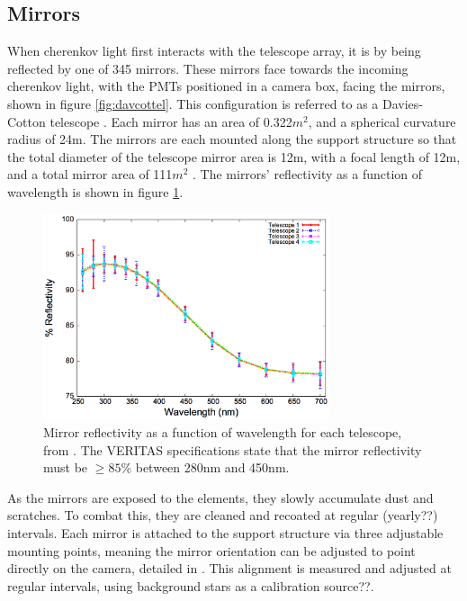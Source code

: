 \subsection{Mirrors}

When cherenkov light first interacts with the telescope array, it is by being reflected by one of 345 mirrors.
These mirrors face towards the incoming cherenkov light, with the PMTs positioned in a camera box, facing the mirrors, shown in figure \ref{fig:davcottel}.
This configuration is referred to as a Davies-Cotton telescope \cite{daviescotton}.
Each mirror has an area of 0.322$m^2$, and a spherical curvature radius of 24m.
The mirrors are each mounted along the support structure so that the total diameter of the telescope mirror area is 12m, with a focal length of 12m, and a total mirror area of 111$m^2$ \cite{Veritas_Detector}.
The mirrors' reflectivity as a function of wavelength is shown in figure \ref{fig:mirreflect}.

\begin{figure}[h]
  \begin{center}
    \includegraphics[width=0.75\textwidth]{images/mirror_reflect}
    \caption[Mirror Reflectivity]{Mirror reflectivity as a function of wavelength for each telescope, from \cite{mirrorfacets}.  The VERITAS specifications state that the mirror reflectivity must be $\geq 85\%$ between 280nm and 450nm.}\label{fig:mirreflect}
  \end{center}
\end{figure}

As the mirrors are exposed to the elements, they slowly accumulate dust and scratches.
To combat this, they are cleaned and recoated at regular (yearly??) intervals.
Each mirror is attached to the support structure via three adjustable mounting points, meaning the mirror orientation can be adjusted to point directly on the camera, detailed in \cite{mirroralign}.
This alignment is measured and adjusted at regular intervals, using background stars as a calibration source??.


